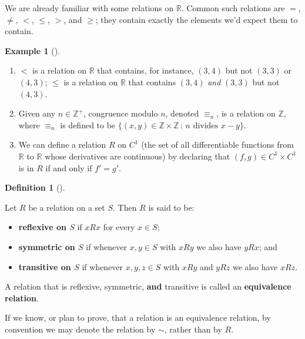 \documentclass[10pt,]{book}
\newcommand{\terminology}[1]{\textbf{#1}}
\theoremstyle{plain}
\theoremstyle{definition}
\newtheorem{definition}[theorem]{Definition}
\theoremstyle{definition}
\theoremstyle{definition}
\newtheorem{example}[theorem]{Example}
\theoremstyle{definition}
\numberwithin{equation}{section}
\def\Z{\mathbb{Z}}
\def\R{\mathbb{R}}
\newcommand{\lt}{ < }
\begin{document}
    We are already familiar with some relations on
    \(\R\). Common such relations are \(=\), \(\neq\), \(\lt\), \(\leq\), \(>\),
    and \(\geq\); they contain exactly the elements we'd expect them to
    contain.
\begin{example}[]\label{example-66}
\leavevmode%
\begin{enumerate}
\item\hypertarget{li-387}{}
            \(\lt\) is a relation on \(\R\) that contains, for instance, \((3,4)\) but not
            \((3,3)\) or \((4,3)\); \(\leq\) is a relation on \(\R\) that contains
            \((3,4)\) \emph{and} \((3,3)\) but not \((4,3)\).
\item\hypertarget{li-388}{}
            Given any \(n\in \Z^+\), congruence modulo \(n\), denoted \(\equiv_n\), is a
            relation on \(\Z\), where \(\equiv_n\) is defined to be \(\{(x,y) \in \Z
            \times \Z \,:\, n \text{ divides } x-y\}\).
\item\hypertarget{li-389}{}
            We can define a relation \(R\) on \(C^1\) (the set of
            all differentiable functions from \(\R\) to \(\R\)
            whose derivatives are continuous) by declaring that
            \((f,g)\in C^1 \times C^1\) is in \(R\) if and only if
            \(f'=g'\).
\end{enumerate}
\end{example}
\begin{definition}[{}]\label{definition-55}

        Let \(R\) be a relation on a set \(S\). Then \(R\) is said to
        be:
\leavevmode%
\begin{itemize}[label=\textbullet]
\item{}
        \terminology{reflexive on \(S\)} if \(xR x\) for every \(x\in S\);
\item{}
        \terminology{symmetric on \(S\)} if whenever \(x,y\in S\) with \(xR y\)
        we also have \(yR x\); and%
\item{}
        \terminology{transitive on \(S\)} if
        whenever \(x,y,z\in S\) with \(xR y\) and \(yR z\) we also have \(xR z\).
\end{itemize}
\par

        A relation that is reflexive,
        symmetric, \terminology{and} transitive is called an \terminology{equivalence
        relation}.
\par
 If we know, or plan to prove, that a relation is an equivalence
          relation, by convention we may denote the relation by \(\sim\),
          rather than by \(R\).%
\end{definition}
\end{document}
